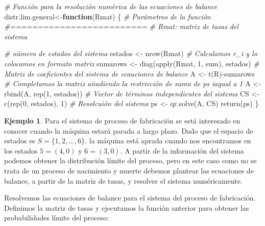 \documentclass[
]{book}
\newenvironment{Shaded}{\begin{snugshade}}{\end{snugshade}}
\newcommand{\CommentTok}[1]{\textcolor[rgb]{0.56,0.35,0.01}{\textit{#1}}}
\newcommand{\ControlFlowTok}[1]{\textcolor[rgb]{0.13,0.29,0.53}{\textbf{#1}}}
\newcommand{\DecValTok}[1]{\textcolor[rgb]{0.00,0.00,0.81}{#1}}
\newcommand{\FunctionTok}[1]{\textcolor[rgb]{0.00,0.00,0.00}{#1}}
\newcommand{\NormalTok}[1]{#1}
\newcommand{\OtherTok}[1]{\textcolor[rgb]{0.56,0.35,0.01}{#1}}
\newcommand{\SpecialCharTok}[1]{\textcolor[rgb]{0.00,0.00,0.00}{#1}}
\theoremstyle{definition}
\theoremstyle{definition}
\newtheorem{example}{Ejemplo}[chapter]
\theoremstyle{definition}
\theoremstyle{definition}
\theoremstyle{remark}
\begin{document}
\begin{Shaded}
\begin{Highlighting}[]
\CommentTok{\# Función para la resolución numérica de las ecuaciones de balance}
\NormalTok{distr.lim.general}\OtherTok{\textless{}{-}}\ControlFlowTok{function}\NormalTok{(Rmat)}
\NormalTok{\{}
  \CommentTok{\# Parámetros de la función}
  \CommentTok{\#=========================}
  \CommentTok{\# Rmat: matriz de tasas del sistema}
  
  \CommentTok{\# número de estados del sistema}
\NormalTok{  estados }\OtherTok{\textless{}{-}} \FunctionTok{nrow}\NormalTok{(Rmat)}
  \CommentTok{\# Calculamos r\_i y lo colocamos en formato matriz}
\NormalTok{  sumarows }\OtherTok{\textless{}{-}} \FunctionTok{diag}\NormalTok{(}\FunctionTok{apply}\NormalTok{(Rmat, }\DecValTok{1}\NormalTok{, sum), estados)}
  \CommentTok{\# Matriz de coeficientes del sistema de ecauciones de balance}
\NormalTok{  A }\OtherTok{\textless{}{-}} \FunctionTok{t}\NormalTok{(R)}\SpecialCharTok{{-}}\NormalTok{sumarows}
  \CommentTok{\# Completamos la matriz añadiendo la restricción de suma de p\textasciigrave{}s iagual a 1}
\NormalTok{  A }\OtherTok{\textless{}{-}} \FunctionTok{rbind}\NormalTok{(A, }\FunctionTok{rep}\NormalTok{(}\DecValTok{1}\NormalTok{, estados))}
  \CommentTok{\# Vector de términos independientes del sistema}
\NormalTok{  CS }\OtherTok{\textless{}{-}} \FunctionTok{c}\NormalTok{(}\FunctionTok{rep}\NormalTok{(}\DecValTok{0}\NormalTok{, estados), }\DecValTok{1}\NormalTok{)}
  \CommentTok{\# Resolcuión del sistema}
\NormalTok{  ps }\OtherTok{\textless{}{-}} \FunctionTok{qr.solve}\NormalTok{(A, CS)}
  \FunctionTok{return}\NormalTok{(ps)}
\NormalTok{\}}
\end{Highlighting}
\end{Shaded}

\begin{example}
Para el sistema de proceso de fabricación se está interesado en conocer cuando la máquina estará parada a largo plazo. Dado que el espacio de estados es \(S = \{1, 2,...,6\}.\) la máquina está aprada cuando nos encontramos en los estados \(5 = (4, 0)\) y \(6 = (3, 0)\). A partir de la información del sistema podemos obtener la distribución límite del proceso, pero en este caso como no se trata de un proceso de nacimiento y muerte debemos plantear las ecuaciones de balance, a partir de la matriz de tasas, y resolver el sistema numéricamente.
\end{example}

Resolvemos las ecuaciones de balance para el sistema del proceso de fabricación. Definimos la matriz de tasas y ejecutamos la función anterior para obtener las probabilidades límite del proceso:
\end{document}
